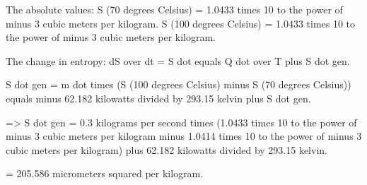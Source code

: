 The absolute values:  
S (70 degrees Celsius) = 1.0433 times 10 to the power of minus 3 cubic meters per kilogram.  
S (100 degrees Celsius) = 1.0433 times 10 to the power of minus 3 cubic meters per kilogram.  

The change in entropy:  
dS over dt = S dot equals Q dot over T plus S dot gen.  

S dot gen = m dot times (S (100 degrees Celsius) minus S (70 degrees Celsius)) equals minus 62.182 kilowatts divided by 293.15 kelvin plus S dot gen.  

=> S dot gen = 0.3 kilograms per second times (1.0433 times 10 to the power of minus 3 cubic meters per kilogram minus 1.0414 times 10 to the power of minus 3 cubic meters per kilogram) plus 62.182 kilowatts divided by 293.15 kelvin.  

= 205.586 micrometers squared per kilogram.